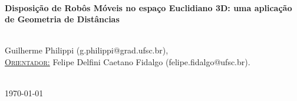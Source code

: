 \documentclass[a4paper,12pt]{article}
\begin{document}
\begin{titlepage}
		
		
		\HRule \\[0.4cm]
		{ \LARGE \bfseries \textbf{Disposição de Robôs Móveis no espaço Euclidiano 3D: uma aplicação de Geometria de Distâncias}} \\ [0.4cm] %
		\HRule \\[2cm]
		
		
		\begin{minipage}{1\textwidth}
			\begin{center} \large
				Guilherme Philippi (g.philippi@grad.ufsc.br),
				\vspace{0.5cm}
				\\
				\underline{\textsc{Orientador:}} \vspace{0.2cm}
				Felipe Delfini Caetano Fidalgo (felipe.fidalgo@ufsc.br).
			\end{center}
		\end{minipage} \\[2cm]
		
		
		{\large \today} %
		
		
		\vfill %
		
	\end{titlepage}
	
	
	\newpage
	\tableofcontents
	\newpage
	
\end{document}
